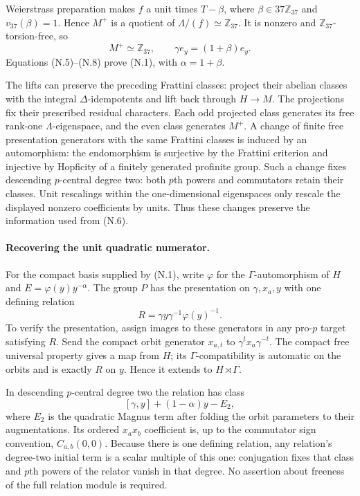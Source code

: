 Weierstrass preparation makes $f$ a unit times $T-\beta$, where $\beta\in37\mathbb Z_{37}$ and $v_{37}(\beta)=1$. Hence $M^+$ is a quotient of $\Lambda/(f)\simeq\mathbb Z_{37}$. It is nonzero and $\mathbb Z_{37}$-torsion-free, so
\[
 M^+\simeq\mathbb Z_{37},\qquad\gamma e_y=(1+\beta)e_y.        \tag{N.8}
\]
Equations (N.5)--(N.8) prove (N.1), with $\alpha=1+\beta$.

The lifts can preserve the preceding Frattini classes: project their abelian classes with the integral $\Delta$-idempotents and lift back through $H\to M$. The projections fix their prescribed residual characters. Each odd projected class generates its free rank-one $\Lambda$-eigenspace, and the even class generates $M^+$. A change of finite free presentation generators with the same Frattini classes is induced by an automorphism: the endomorphism is surjective by the Frattini criterion and injective by Hopficity of a finitely generated profinite group. Such a change fixes descending $p$-central degree two: both $p$th powers and commutators retain their classes. Unit rescalings within the one-dimensional eigenspaces only rescale the displayed nonzero coefficients by units. Thus these changes preserve the information used from (N.6).

\paragraph{Recovering the unit quadratic numerator.}
For the compact basis supplied by (N.1), write $\varphi$ for the $\Gamma$-automorphism of $H$ and $E=\varphi(y)y^{-\alpha}$. The group $P$ has the presentation on $\gamma,x_a,y$ with one defining relation
\[
 R=\gamma y\gamma^{-1}\varphi(y)^{-1}.
\]
To verify the presentation, assign images to these generators in any pro-$p$ target satisfying $R$. Send the compact orbit generator $x_{a,t}$ to $\gamma^t x_a\gamma^{-t}$. The compact free universal property gives a map from $H$; its $\Gamma$-compatibility is automatic on the orbits and is exactly $R$ on $y$. Hence it extends to $H\rtimes\Gamma$.

In descending $p$-central degree two the relation has class
\[
 [\gamma,y]+(1-\alpha)y-E_2,
\]
where $E_2$ is the quadratic Magnus term after folding the orbit parameters to their augmentations. Its ordered $x_a x_b$ coefficient is, up to the commutator sign convention, $C_{a,b}(0,0)$. Because there is one defining relation, any relation's degree-two initial term is a scalar multiple of this one: conjugation fixes that class and $p$th powers of the relator vanish in that degree. No assertion about freeness of the full relation module is required.

